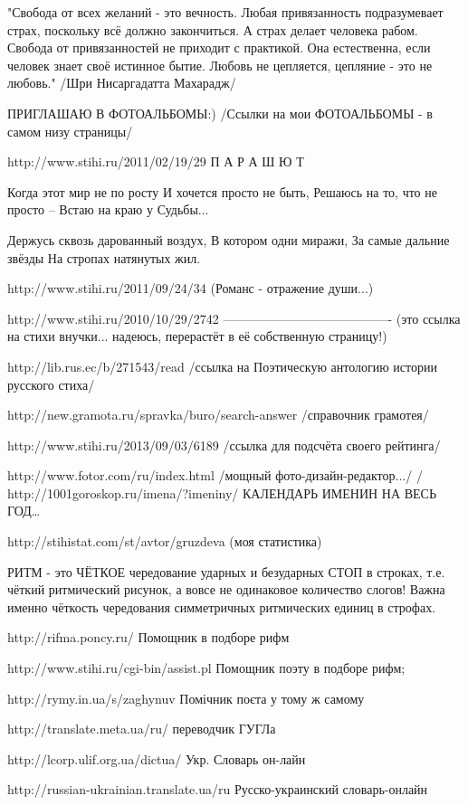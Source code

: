 "Свобода от всех желаний - это вечность.
Любая привязанность подразумевает страх, поскольку всё должно закончиться. А страх делает человека рабом.
Свобода от привязанностей не приходит с практикой.
Она естественна, если человек знает своё истинное бытие.
Любовь не цепляется, цепляние - это не любовь."
/Шри Нисаргадатта Махарадж/


ПРИГЛАШАЮ В ФОТОАЛЬБОМЫ:)
/Ссылки на мои ФОТОАЛЬБОМЫ - в самом низу страницы/

http://www.stihi.ru/2011/02/19/29
П А Р А Ш Ю Т

Когда этот мир не по росту
И хочется просто не быть,
Решаюсь на то, что не просто –
Встаю на краю у Судьбы...

Держусь сквозь дарованный воздух,
В котором одни миражи,
За самые дальние звёзды
На стропах натянутых жил.

http://www.stihi.ru/2011/09/24/34
(Романс - отражение души...)

http://www.stihi.ru/2010/10/29/2742
----------------------------------------
(это ссылка на стихи внучки... надеюсь, перерастёт в её собственную страницу!)

http://lib.rus.ec/b/271543/read
/ссылка на Поэтическую антологию истории русского стиха/

http://new.gramota.ru/spravka/buro/search-answer
/справочник грамотея/

http://www.stihi.ru/2013/09/03/6189
/ссылка для подсчёта своего рейтинга/

http://www.fotor.com/ru/index.html
/мощный фото-дизайн-редактор.../
/
http://1001goroskop.ru/imena/?imeniny/
КАЛЕНДАРЬ ИМЕНИН НА ВЕСЬ ГОД…

http://stihistat.com/st/avtor/gruzdeva
(моя статистика)

РИТМ - это ЧЁТКОЕ чередование ударных и безударных СТОП в строках, т.е. чёткий ритмический рисунок, а вовсе не одинаковое количество слогов! Важна именно чёткость чередования симметричных ритмических единиц в строфах.

http://rifma.poncy.ru/
Помощник в подборе рифм

http://www.stihi.ru/cgi-bin/assist.pl
Помощник поэту в подборе рифм;

http://rymy.in.ua/s/zaghynuv
Помічник поєта у тому ж самому

http://translate.meta.ua/ru/
переводчик ГУГЛа

http://lcorp.ulif.org.ua/dictua/
Укр. Словарь он-лайн

http://russian-ukrainian.translate.ua/ru
Русско-украинский словарь-онлайн

